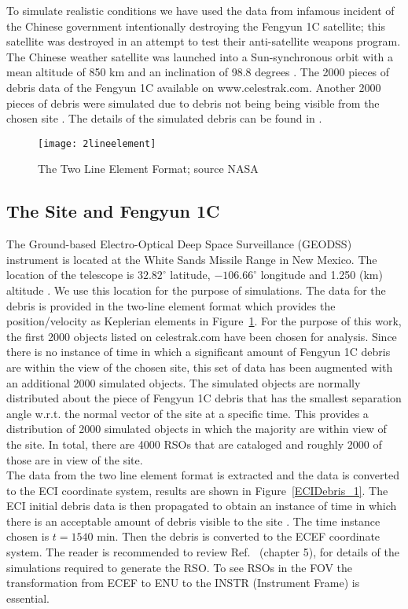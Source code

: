 \documentclass[]{aiaa-tc}%
\begin{document}
To simulate realistic conditions we have used the data from infamous incident of the Chinese government intentionally destroying the Fengyun 1C satellite; this satellite was destroyed in  an attempt to test their anti-satellite weapons program.  The Chinese weather satellite was launched into a Sun-synchronous orbit with a mean altitude of 850 km and an inclination of 98.8 degrees \cite{johnson_characteristics_2008}. The 2000 pieces of debris data of the Fengyun 1C available on www.celestrak.com. Another 2000 pieces of debris were simulated due to debris not being  being visible from the chosen site \cite{silversmith}. The details of the simulated debris can be found in \cite{silversmith}.\\

\begin{figure}[h]
\centering
\texttt{[image: 2lineelement]}
\caption{The Two Line Element Format; source NASA}
\label{TLE}
\end{figure}

\subsection{The Site and Fengyun 1C}

The Ground-based Electro-Optical Deep Space Surveillance (GEODSS) instrument is located at the White Sands Missile Range in New Mexico. The location of the telescope is $32.82^{\circ}$ latitude, $-106.66^{\circ}$ longitude and 1.250 (km) altitude \cite{silversmith}. We use this location for the purpose of simulations.
The data for the debris is provided in the two-line element format which provides the position/velocity as Keplerian elements in Figure~\ref{TLE}. For the purpose of this work, the first 2000 objects listed on celestrak.com have been chosen for analysis. Since there is no instance of time in which a significant amount of Fengyun 1C debris are within the view of the chosen site, this set of data has been augmented with an additional 2000 simulated objects. The simulated objects are normally distributed about the piece of Fengyun 1C debris that has the smallest separation angle w.r.t. the normal vector of the site at a specific
time. This provides a distribution of 2000 simulated objects in which the majority are within view of the site. In total, there are 4000 RSOs that are cataloged and roughly 2000 of those are in view of the site.\\


The data from the two line element format is extracted and the data is converted to the ECI coordinate system, results are shown in Figure~\ref{ECIDebris_1}. The ECI initial debris data is then propagated to obtain an instance of time in which there is an acceptable amount of debris visible to the site \cite{silversmith}. The time instance chosen is $t = 1540$ min. Then the debris is converted to the ECEF coordinate system. The reader is recommended to review Ref.~ (chapter 5), for details of the simulations required to generate the RSO. To see RSOs in the FOV the transformation from ECEF to ENU to the INSTR (Instrument Frame) is essential.\\
\end{document}
